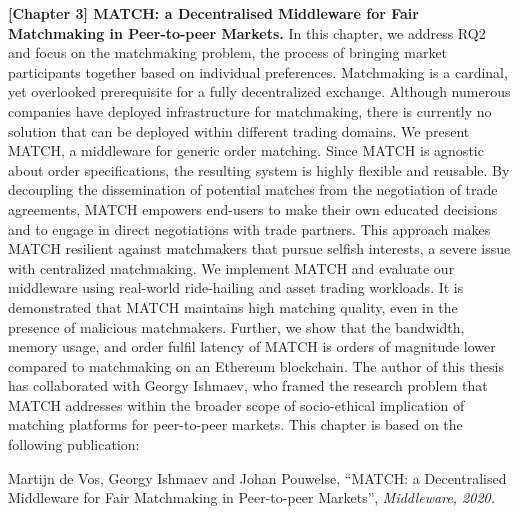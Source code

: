 \textbf{[Chapter 3] MATCH: a Decentralised Middleware for Fair Matchmaking in Peer-to-peer Markets.}
In this chapter, we address RQ2 and focus on the matchmaking problem, the process of bringing market participants together based on individual preferences.
Matchmaking is a cardinal, yet overlooked prerequisite for a fully decentralized exchange.
Although numerous companies have deployed infrastructure for matchmaking, there is currently no solution that can be deployed within different trading domains.
We present MATCH, a middleware for generic order matching.
Since MATCH is agnostic about order specifications, the resulting system is highly flexible and reusable.
By decoupling the dissemination of potential matches from the negotiation of trade agreements, MATCH empowers end-users to make their own educated decisions and to engage in direct negotiations with trade partners.
This approach makes MATCH resilient against matchmakers that pursue selfish interests, a severe issue with centralized matchmaking.
We implement MATCH and evaluate our middleware using real-world ride-hailing and asset trading workloads.
It is demonstrated that MATCH maintains high matching quality, even in the presence of malicious matchmakers.
Further, we show that the bandwidth, memory usage, and order fulfil latency of MATCH is orders of magnitude lower compared to matchmaking on an Ethereum blockchain.
The author of this thesis has collaborated with Georgy Ishmaev, who framed the research problem that MATCH addresses within the broader scope of socio-ethical implication of matching platforms for peer-to-peer markets.
This chapter is based on the following publication:

Martijn de Vos, Georgy Ishmaev and Johan Pouwelse, \enquote{MATCH: a Decentralised Middleware for Fair Matchmaking in Peer-to-peer Markets}, \emph{Middleware, 2020.}\\

